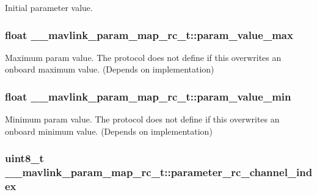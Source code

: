 Initial parameter value. 

\hypertarget{struct____mavlink__param__map__rc__t_a7715dfceec0ff1cd367c221c408ab452}{
\subsubsection[{param\+\_\+value\+\_\+max}]{\setlength{\rightskip}{0pt plus 5cm}float \+\_\+\+\_\+mavlink\+\_\+param\+\_\+map\+\_\+rc\+\_\+t\+::param\+\_\+value\+\_\+max}}\label{struct____mavlink__param__map__rc__t_a7715dfceec0ff1cd367c221c408ab452}


Maximum param value. The protocol does not define if this overwrites an onboard maximum value. (Depends on implementation) 

\hypertarget{struct____mavlink__param__map__rc__t_a2f52d850cde082e38471f77cad638da4}{
\subsubsection[{param\+\_\+value\+\_\+min}]{\setlength{\rightskip}{0pt plus 5cm}float \+\_\+\+\_\+mavlink\+\_\+param\+\_\+map\+\_\+rc\+\_\+t\+::param\+\_\+value\+\_\+min}}\label{struct____mavlink__param__map__rc__t_a2f52d850cde082e38471f77cad638da4}


Minimum param value. The protocol does not define if this overwrites an onboard minimum value. (Depends on implementation) 

\hypertarget{struct____mavlink__param__map__rc__t_adf04e5719c255e3c8792da8ceab80de8}{
\subsubsection[{parameter\+\_\+rc\+\_\+channel\+\_\+index}]{\setlength{\rightskip}{0pt plus 5cm}uint8\+\_\+t \+\_\+\+\_\+mavlink\+\_\+param\+\_\+map\+\_\+rc\+\_\+t\+::parameter\+\_\+rc\+\_\+channel\+\_\+index}}\label{struct____mavlink__param__map__rc__t_adf04e5719c255e3c8792da8ceab80de8}



